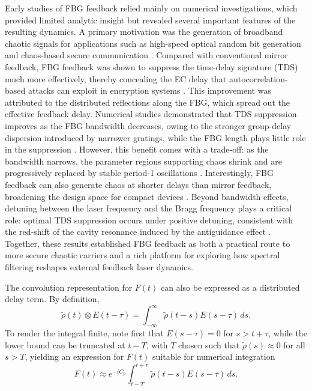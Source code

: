 %
Early studies of FBG feedback relied mainly on numerical investigations, which provided limited analytic insight but revealed several important features of the resulting dynamics.
A primary motivation was the generation of broadband chaotic signals for applications such as high-speed optical random bit generation \cite{uchida2008fast} and chaos-based secure communication \cite{annovazzi2008secure}.
Compared with conventional mirror feedback, FBG feedback was shown to suppress the time-delay signature (TDS) much more effectively, thereby concealing the EC delay that autocorrelation-based attacks can exploit in encryption systems \cite{li2012distributed, jiang2021characterizing}.
This improvement was attributed to the distributed reflections along the FBG, which spread out the effective feedback delay.
Numerical studies demonstrated that TDS suppression improves as the FBG bandwidth decreases, owing to the stronger group-delay dispersion introduced by narrower gratings, while the FBG length plays little role in the suppression \cite{li2012distributed}.
However, this benefit comes with a trade-off: as the bandwidth narrows, the parameter regions supporting chaos shrink and are progressively replaced by stable period-1 oscillations \cite{li2020stable}.
Interestingly, FBG feedback can also generate chaos at shorter delays than mirror feedback, broadening the design space for compact devices \cite{li2012distributed}.
Beyond bandwidth effects, detuning between the laser frequency and the Bragg frequency plays a critical role: optimal TDS suppression occurs under positive detuning, consistent with the red-shift of the cavity resonance induced by the antiguidance effect \cite{li2015chaotic}.
Together, these results established FBG feedback as both a practical route to more secure chaotic carriers and a rich platform for exploring how spectral filtering reshapes external feedback laser dynamics.
%
\par
%
The convolution representation for $F(t)$ can also be expressed as a distributed delay term.
By definition,
\begin{equation*}
\tilde{\rho}(t) \otimes E(t-\tau) = \int_{-\infty}^{\infty} \tilde{\rho}(t-s) E(s-\tau)\,ds.
\end{equation*}
%
To render the integral finite, note first that $E(s-\tau) = 0$ for $s > t+\tau$, while the lower bound can be truncated at $t-T$, with $T$ chosen such that $\tilde{\rho}(s) \approx 0$ for all $s > T$, yielding an expression for $F(t)$ suitable for numerical integration
%
\begin{equation}
    \label{eq:distributed}
F(t) \approx e^{-i C_p} \int_{t-T}^{t+\tau} \tilde{\rho}(t-s) E(s-\tau)\,ds.
\end{equation}
